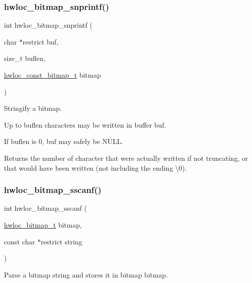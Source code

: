 \subsubsection{\texorpdfstring{hwloc\+\_\+bitmap\+\_\+snprintf()}{hwloc\_bitmap\_snprintf()}}
{\footnotesize\ttfamily int hwloc\+\_\+bitmap\+\_\+snprintf (\begin{DoxyParamCaption}\item[{char $\ast$restrict}]{buf,  }\item[{size\+\_\+t}]{buflen,  }\item[{\hyperlink{a00205_gae991a108af01d408be2776c5b2c467b2}{hwloc\+\_\+const\+\_\+bitmap\+\_\+t}}]{bitmap }\end{DoxyParamCaption})}



Stringify a bitmap. 

Up to {\ttfamily buflen} characters may be written in buffer {\ttfamily buf}.

If {\ttfamily buflen} is 0, {\ttfamily buf} may safely be {\ttfamily N\+U\+LL}.

\begin{DoxyReturn}{Returns}
the number of character that were actually written if not truncating, or that would have been written (not including the ending \textbackslash{}0). 
\end{DoxyReturn}
\mbox{\label{a00205_ga064a85c643a364b60acbfa0f3663fc18}} 
\subsubsection{\texorpdfstring{hwloc\+\_\+bitmap\+\_\+sscanf()}{hwloc\_bitmap\_sscanf()}}
{\footnotesize\ttfamily int hwloc\+\_\+bitmap\+\_\+sscanf (\begin{DoxyParamCaption}\item[{\hyperlink{a00205_gaa3c2bf4c776d603dcebbb61b0c923d84}{hwloc\+\_\+bitmap\+\_\+t}}]{bitmap,  }\item[{const char $\ast$restrict}]{string }\end{DoxyParamCaption})}



Parse a bitmap string and stores it in bitmap {\ttfamily bitmap}. 

\mbox{\label{a00205_ga391312513f17c985d871f18367c59512}} 
